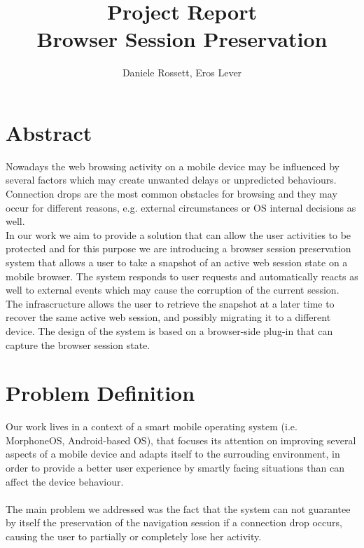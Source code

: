 \documentclass[11pt,a4paper]{article}
\title{\textbf{Project Report}\\Browser Session Preservation}
\author{Daniele Rossett, Eros Lever}
\begin{document}
\maketitle
\section{Abstract}
Nowadays the web browsing activity on a mobile device may be influenced by several factors which may create unwanted delays or unpredicted behaviours. Connection drops are the most common obstacles for browsing and they may occur for different reasons, e.g. external circumstances or OS internal decisions as well.\\
In our work we aim to provide a solution that can allow the user activities to be protected and for this purpose we are introducing a browser session preservation system that allows a user to take a snapshot of an active web session state on a mobile browser. The system responds to user requests and automatically reacts as well to external events which may cause the corruption of the current session.\\
The infrascructure allows the user to retrieve the snapshot at a later time to recover the same active web session, and possibly migrating it to a different device. The design of the system is based on a browser-side plug-in that can capture the browser session state.


\section{Problem Definition}
Our work lives in a context of a smart mobile operating system (i.e. MorphoneOS, Android-based OS), that focuses its attention on improving several aspects of a mobile device and adapts itself to the surrouding environment, in order to provide a better user experience by smartly facing situations than can affect the device behaviour.\\ \\
The main problem we addressed was the fact that the system can not guarantee by itself the preservation of the navigation session if a connection drop occurs, causing the user to partially or completely lose her activity.\\
\end{document}
